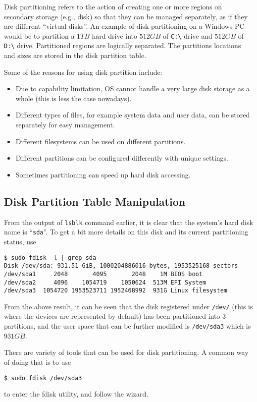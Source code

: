 Disk partitioning refers to the action of creating one or more regions on secondary storage (e.g., disk) so that they can be managed separately, as if they are different ``virtual disks''. An example of disk partitioning on a Windows PC would be to partition a $1TB$ hard drive into $512GB$ of \verb|C:\| drive and $512GB$ of \verb|D:\| drive. Partitioned regions are logically separated. The partitions locations and sizes are stored in the disk partition table.

Some of the reasons for using disk partition include:
\begin{itemize}
  \item Due to capability limitation, OS cannot handle a very large disk storage as a whole (this is less the case nowadays).
  \item Different types of files, for example system data and user data, can be stored separately for easy management.
  \item Different filesystems can be used on different partitions.
  \item Different partitions can be configured differently with unique settings.
  \item Sometimes partitioning can speed up hard disk accessing.
\end{itemize}

\subsection{Disk Partition Table Manipulation}

From the output of \verb|lsblk| command earlier, it is clear that the system's hard disk name is ``\verb|sda|''. To get a bit more details on this disk and its current partitioning status, use
\begin{lstlisting}
$ sudo fdisk -l | grep sda
Disk /dev/sda: 931.51 GiB, 1000204886016 bytes, 1953525168 sectors
/dev/sda1     2048       4095       2048    1M BIOS boot
/dev/sda2     4096    1054719    1050624  513M EFI System
/dev/sda3  1054720 1953523711 1952468992  931G Linux filesystem
\end{lstlisting}

From the above result, it can be seen that the disk registered under \verb|/dev/| (this is where the devices are represented by default) has been partitioned into 3 partitions, and the user space that can be further modified is \verb|/dev/sda3| which is $931GB$.

There are variety of tools that can be used for disk partitioning. A common way of doing that is to use
\begin{lstlisting}
$ sudo fdisk /dev/sda3
\end{lstlisting}
to enter the fdisk utility, and follow the wizard.

